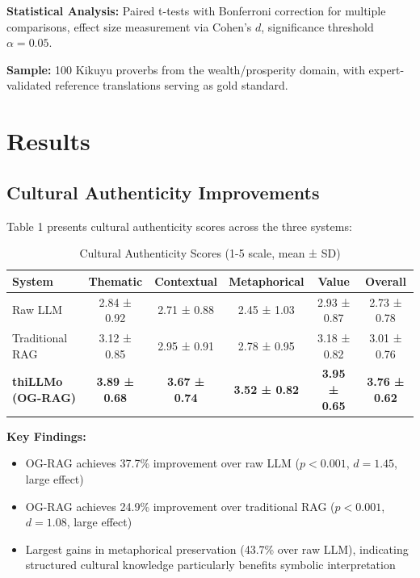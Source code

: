 \documentclass[a4paper,11pt]{article}
\begin{document}
\textbf{Statistical Analysis:} Paired t-tests with Bonferroni correction for multiple comparisons, effect size measurement via Cohen's $d$, significance threshold $\alpha = 0.05$.

\textbf{Sample:} 100 Kikuyu proverbs from the wealth/prosperity domain, with expert-validated reference translations serving as gold standard.

\section{Results}

\subsection{Cultural Authenticity Improvements}

Table 1 presents cultural authenticity scores across the three systems:

\begin{table}[h]
\centering
\caption{Cultural Authenticity Scores (1-5 scale, mean ± SD)}
\begin{tabular}{@{}lccccc@{}}
\toprule
\textbf{System} & \textbf{Thematic} & \textbf{Contextual} & \textbf{Metaphorical} & \textbf{Value} & \textbf{Overall} \\
\midrule
Raw LLM & 2.84 ± 0.92 & 2.71 ± 0.88 & 2.45 ± 1.03 & 2.93 ± 0.87 & 2.73 ± 0.78 \\
Traditional RAG & 3.12 ± 0.85 & 2.95 ± 0.91 & 2.78 ± 0.95 & 3.18 ± 0.82 & 3.01 ± 0.76 \\
\textbf{thiLLMo (OG-RAG)} & \textbf{3.89 ± 0.68} & \textbf{3.67 ± 0.74} & \textbf{3.52 ± 0.82} & \textbf{3.95 ± 0.65} & \textbf{3.76 ± 0.62} \\
\bottomrule
\end{tabular}
\end{table}

\textbf{Key Findings:}
\begin{itemize}
    \item OG-RAG achieves 37.7\% improvement over raw LLM ($p < 0.001$, $d = 1.45$, large effect)
    \item OG-RAG achieves 24.9\% improvement over traditional RAG ($p < 0.001$, $d = 1.08$, large effect)
    \item Largest gains in metaphorical preservation (43.7\% over raw LLM), indicating structured cultural knowledge particularly benefits symbolic interpretation
\end{itemize}
\end{document}
